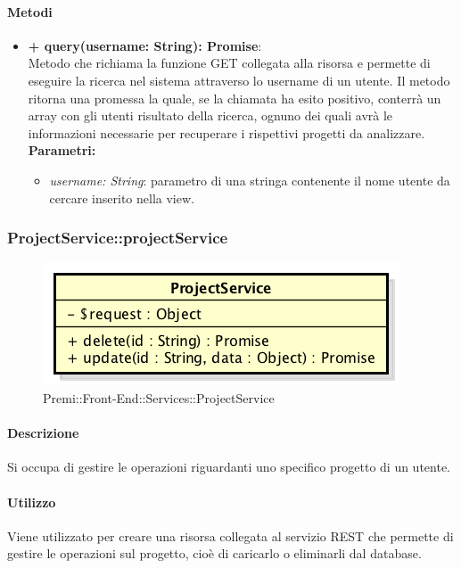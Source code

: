 		\paragraph{Metodi}
		\begin{itemize}
			\item \textbf{+ query(username: String): Promise}:\\
			Metodo che richiama la funzione GET collegata alla risorsa e permette di eseguire la ricerca nel sistema attraverso lo username di un utente. Il metodo ritorna una promessa la quale, se la chiamata ha esito positivo, conterrà un array con gli utenti risultato della ricerca, ognuno dei quali avrà le informazioni necessarie per recuperare i rispettivi progetti da analizzare.\\
			\textbf{Parametri:}\\
			\begin{itemize}
				\item \textit{username: String}: parametro di una stringa contenente il nome utente da cercare inserito nella view.
			\end{itemize}
		\end{itemize}
\newpage
		
		
		\subsubsection{ProjectService::projectService}
		\begin{figure}[h]
			\centering
				\includegraphics[width=0.4\linewidth]{img/premi_front_end_services_projectservice}
			\caption[Premi::Front-End::Services::ProjectService]{Premi::Front-End::Services::ProjectService}
		\end{figure}
		
		\paragraph{Descrizione}
		Si occupa di gestire le operazioni riguardanti uno specifico progetto di un utente.
		
		\paragraph{Utilizzo}
		Viene utilizzato per creare una risorsa collegata al servizio \gls{REST} che permette di gestire le operazioni sul progetto, cioè di caricarlo o eliminarli dal \gls{database}.
		
